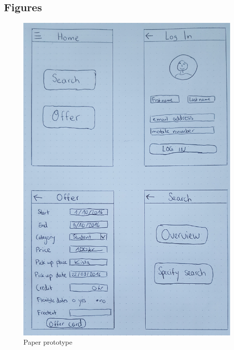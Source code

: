 \documentclass[11pt,twoside,a4paper]{report}
\begin{document}
\begin{appendices}

\chapter{Figures}
\label{appendix}

\thispagestyle{empty}

\begin{figure}
	\centering
	\includegraphics[width=\textwidth]{Paper_prototype1.jpg}
	\caption{Paper prototype}
	\label{figure:paper-prototype-1}
\end{figure}


\end{appendices}
\end{document}
